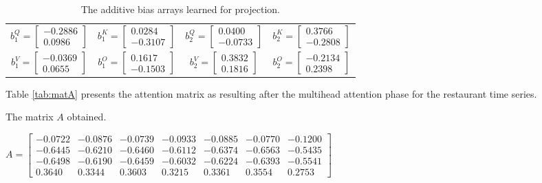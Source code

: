 \documentclass[algorithms,article,submit,pdftex,moreauthors]{Definitions/mdpi}
\begin{document}
\begin{table}
	\centering
	\caption{The additive bias arrays learned for projection.}
	\label{tab:bias}
	\begin{tabular}{c c c c}
		$b^{Q}_1 = \begin{bmatrix} -0.2886 \\ 0.0986 \end{bmatrix}$ 
		& $b^{K}_1 = \begin{bmatrix} 0.0284 \\ -0.3107 \end{bmatrix}$ 
		& $b^{Q}_2 = \begin{bmatrix} 0.0400 \\ -0.0733 \end{bmatrix}$ 
		& $b^{K}_2 = \begin{bmatrix} 0.3766 \\ -0.2808 \end{bmatrix}$ \\
		$b^{V}_1 = \begin{bmatrix} -0.0369 \\ 0.0655 \end{bmatrix}$ 
		& $b^{O}_1 = \begin{bmatrix} 0.1617 \\ -0.1503 \end{bmatrix}$ 
		& $b^{V}_2 = \begin{bmatrix} 0.3832 \\ 0.1816 \end{bmatrix}$ 
		& $b^{O}_2 = \begin{bmatrix} -0.2134 \\  0.2398 \end{bmatrix}$ \\
	\end{tabular}
\end{table}

\noindent Table \ref{tab:matA} presents the attention matrix as resulting after the multihead attention phase for the restaurant time series.

\begin{table}[ht]
	\centering
	\caption{The matrix $A$ obtained.}
	\label{tab:matA}
	$
	A = \begin{bmatrix}
		-0.0722 & -0.0876 & -0.0739 & -0.0933 & -0.0885 & -0.0770 & -0.1200 \\
		-0.6445 & -0.6210 & -0.6460 & -0.6112 & -0.6374 & -0.6563 & -0.5435 \\
		-0.6498 & -0.6190 & -0.6459 & -0.6032 & -0.6224 & -0.6393 & -0.5541 \\
		0.3640 &  0.3344 &  0.3603 &  0.3215 &  0.3361 &  0.3554 &  0.2753
	\end{bmatrix}
	$
\end{table}
\end{document}
